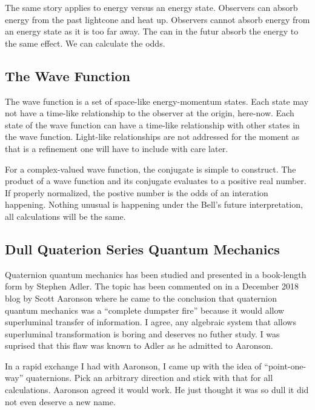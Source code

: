 The same story applies to energy versus an energy state. Observers can
absorb energy from the past lightcone and heat up. Observers cannot
absorb energy from an energy state as it is too far away. The can in the
futur absorb the energy to the same effect. We can calculate the odds.

\hypertarget{the-wave-function}{%
\subsection{The Wave Function}\label{the-wave-function}}

The wave function is a set of space-like energy-momentum states. Each
state may not have a time-like relationship to the observer at the
origin, here-now. Each state of the wave function can have a time-like
relationship with other states in the wave function. Light-like
relationships are not addressed for the moment as that is a refinement
one will have to include with care later.

For a complex-valued wave function, the conjugate is simple to
construct. The product of a wave function and its conjugate evaluates to
a positive real number. If properly normalized, the postive number is
the odds of an interation happening. Nothing unusual is happening under
the Bell's future interpretation, all calculations will be the same.

\hypertarget{dull-quaterion-series-quantum-mechanics}{%
\subsection{Dull Quaterion Series Quantum
Mechanics}\label{dull-quaterion-series-quantum-mechanics}}

Quaternion quantum mechanics has been studied and presented in a
book-length form by Stephen Adler. The topic has been commented on in a
December 2018 blog by Scott Aaronson where he came to the conclusion
that quaternion quantum mechanics was a ``complete dumpster fire''
because it would allow superluminal transfer of information. I agree,
any algebraic system that allows superluminal transformation is boring
and deserves no futher study. I was suprised that this flaw was known to
Adler as he admitted to Aaronson.

In a rapid exchange I had with Aaronson, I came up with the idea of
``point-one-way'' quaternions. Pick an arbitrary direction and stick
with that for all calculations. Aaronson agreed it would work. He just
thought it was so dull it did not even deserve a new name.

